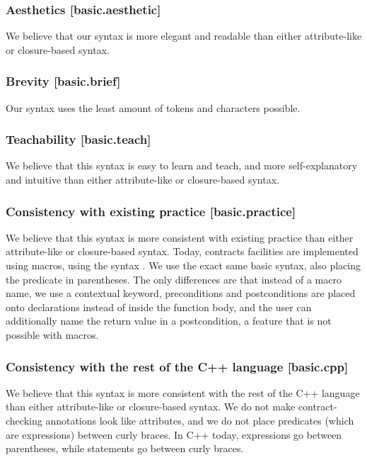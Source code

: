 \subsubsection{Aesthetics  [basic.aesthetic]}

We believe that our syntax is more elegant and readable than either attribute-like or closure-based syntax.

\subsubsection{Brevity  [basic.brief]}

Our syntax uses the least amount of tokens and characters possible.

\subsubsection{Teachability  [basic.teach]}

We believe that this syntax is easy to learn and teach, and more self-explanatory and intuitive than either attribute-like or closure-based syntax.

\subsubsection{Consistency with existing practice  [basic.practice]}

We believe that this syntax is more consistent with existing practice than either attribute-like or closure-based syntax. Today, contracts facilities are implemented using macros, using the syntax . We use the exact same basic syntax, also placing the predicate in parentheses. The only differences are that instead of a macro name, we use a contextual keyword, preconditions and postconditions are placed onto declarations instead of inside the function body, and the user can additionally name the return value in a postcondition, a feature that is not possible with macros.

\subsubsection{Consistency with the rest of the C++ language  [basic.cpp]}

We believe that this syntax is more consistent with the rest of the C++ language than either attribute-like or closure-based syntax. We do not make contract-checking annotations look like attributes, and we do not place predicates (which are expressions) between curly braces. In C++ today, expressions go between parentheses, while statements go between curly braces.

